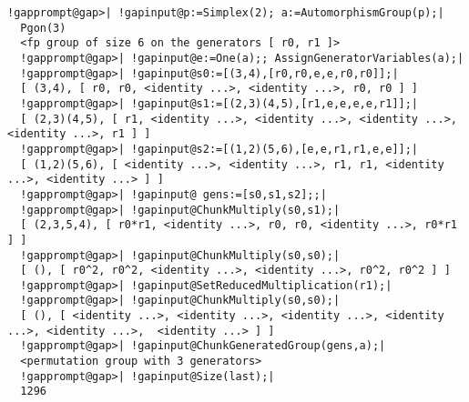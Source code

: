 \documentclass[a4paper,11pt]{report}
\begin{document}
{{ 
\begin{Verbatim}[commandchars=!@|,fontsize=\small,frame=single,label=Example]
  !gapprompt@gap>| !gapinput@p:=Simplex(2); a:=AutomorphismGroup(p);|
  Pgon(3)
  <fp group of size 6 on the generators [ r0, r1 ]>
  !gapprompt@gap>| !gapinput@e:=One(a);; AssignGeneratorVariables(a);|
  !gapprompt@gap>| !gapinput@s0:=[(3,4),[r0,r0,e,e,r0,r0]];|
  [ (3,4), [ r0, r0, <identity ...>, <identity ...>, r0, r0 ] ]
  !gapprompt@gap>| !gapinput@s1:=[(2,3)(4,5),[r1,e,e,e,e,r1]];|
  [ (2,3)(4,5), [ r1, <identity ...>, <identity ...>, <identity ...>, <identity ...>, r1 ] ]
  !gapprompt@gap>| !gapinput@s2:=[(1,2)(5,6),[e,e,r1,r1,e,e]];|
  [ (1,2)(5,6), [ <identity ...>, <identity ...>, r1, r1, <identity ...>, <identity ...> ] ]
  !gapprompt@gap>| !gapinput@ gens:=[s0,s1,s2];;|
  !gapprompt@gap>| !gapinput@ChunkMultiply(s0,s1);|
  [ (2,3,5,4), [ r0*r1, <identity ...>, r0, r0, <identity ...>, r0*r1 ] ]
  !gapprompt@gap>| !gapinput@ChunkMultiply(s0,s0);|
  [ (), [ r0^2, r0^2, <identity ...>, <identity ...>, r0^2, r0^2 ] ]
  !gapprompt@gap>| !gapinput@SetReducedMultiplication(r1);|
  !gapprompt@gap>| !gapinput@ChunkMultiply(s0,s0);|
  [ (), [ <identity ...>, <identity ...>, <identity ...>, <identity ...>, <identity ...>,  <identity ...> ] ]
  !gapprompt@gap>| !gapinput@ChunkGeneratedGroup(gens,a);|
  <permutation group with 3 generators>
  !gapprompt@gap>| !gapinput@Size(last);|
  1296
\end{Verbatim}
 }

 }

   
\end{document}
